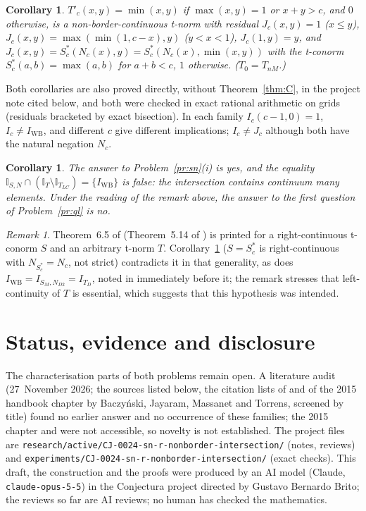 \documentclass[11pt]{amsart}
\newtheorem{corollary}[theorem]{Corollary}
\theoremstyle{remark}
\newtheorem{remark}[theorem]{Remark}
\newcommand{\IWB}{I_{\mathrm{WB}}}
\newcommand{\cI}{\mathbb{I}}
\begin{document}
\begin{corollary}\label{cor:B}
$T'_c(x,y)=\min(x,y)$ if $\max(x,y)=1$ or $x+y>c$, and $0$ otherwise, is a
non-border-continuous t-norm with residual $J_c(x,y)=1$ ($x\le y$),
$J_c(x,y)=\max(\min(1,c-x),y)$ ($y<x<1$), $J_c(1,y)=y$, and
$J_c(x,y)=S^*_c(N_c(x),y)=S^*_c(N_c(x),\min(x,y))$ with the t-conorm
$S^*_c(a,b)=\max(a,b)$ for $a+b<c$, $1$ otherwise. ($T_0=T_{nM}$.)
\end{corollary}

Both corollaries are also proved directly, without Theorem~\ref{thm:C}, in the
project note cited below, and both were checked in exact rational arithmetic on
grids (residuals bracketed by exact bisection). In each family $I_c(c-1,0)=1$,
$I_c\ne\IWB$, and different $c$ give different implications; $I_c\ne J_c$
although both have the natural negation $N_c$.

\begin{corollary}
The answer to Problem~\ref{pr:sn}(i) is yes, and the equality
$\cI_{S,N}\cap(\cI_T\setminus\cI_{T_{LC}})=\{\IWB\}$ is false: the
intersection contains continuum many elements. Under the reading of the
remark above, the answer to the first question of Problem~\ref{pr:ql} is no.
\end{corollary}

\begin{remark}
Theorem~6.5 of \cite{BJ2008} (Theorem~5.14 of \cite{BJ2010}) is printed for a
right-continuous t-conorm $S$ and an arbitrary t-norm $T$. Corollary~\ref{cor:B}
($S=S^*_c$ is right-continuous with $N_{S^*_c}=N_c$, not strict) contradicts
it in that generality, as does $\IWB=I_{S_M,N_{D2}}=I_{T_D}$, noted in
\cite[Remark~6.4(i)]{BJ2008} immediately before it; the remark stresses that
left-continuity of $T$ is essential, which suggests that this hypothesis was
intended.
\end{remark}

\section*{Status, evidence and disclosure}

The characterisation parts of both problems remain open. A literature audit
(27~November 2026; the sources listed below, the citation lists of
\cite{BJ2008,BJ2010} and of the 2015 handbook chapter by Baczy\'nski,
Jayaram, Massanet and Torrens, screened by title) found no earlier answer and
no occurrence of these families; the 2015 chapter and \cite{BJ2008book} were
not accessible, so novelty is not established. The project files are
\texttt{research/active/CJ-0024-sn-r-nonborder-intersection/} (notes, reviews)
and \texttt{experiments/CJ-0024-sn-r-nonborder-intersection/} (exact checks).
This draft, the construction and the proofs were produced by an AI model
(Claude, \texttt{claude-opus-5-5}) in the Conjectura project directed by
Gustavo Bernardo Brito; the reviews so far are AI reviews; no human has
checked the mathematics.
\end{document}

